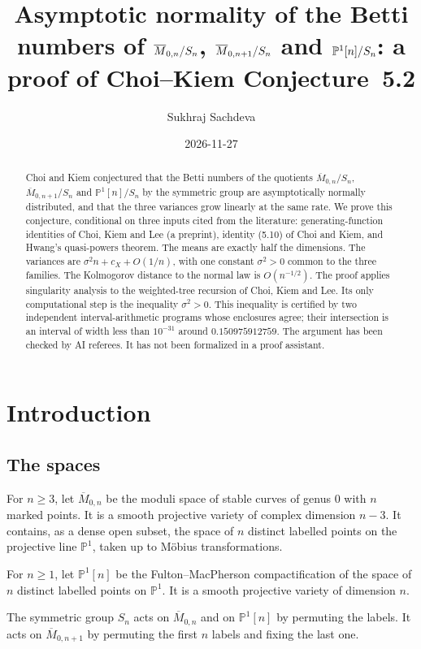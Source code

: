 \documentclass[11pt]{amsart}
\title[Asymptotic normality of Betti numbers of moduli quotients]{Asymptotic normality of the Betti numbers of \(\Mbar_{0,n}/S_n\), \(\Mbar_{0,n+1}/S_n\) and \(\PP^1[n]/S_n\): a proof of Choi--Kiem Conjecture~5.2}
\author{Sukhraj Sachdeva}
\date{2026-11-27\doiline}
\theoremstyle{definition}
\theoremstyle{remark}
\numberwithin{equation}{section}
\newcommand{\Mbar}{\overline{M}}
\newcommand{\PP}{\mathbb{P}}
\begin{document}
\begin{abstract}
Choi and Kiem conjectured that the Betti numbers of the quotients \(\Mbar_{0,n}/S_n\), \(\Mbar_{0,n+1}/S_n\) and \(\PP^1[n]/S_n\) by the symmetric group are asymptotically normally distributed, and that the three variances grow linearly at the same rate. We prove this conjecture, conditional on three inputs cited from the literature: generating-function identities of Choi, Kiem and Lee (a preprint), identity (5.10) of Choi and Kiem, and Hwang's quasi-powers theorem. The means are exactly half the dimensions. The variances are \(\sigma^2 n+c_X+O(1/n)\), with one constant \(\sigma^2>0\) common to the three families. The Kolmogorov distance to the normal law is \(O(n^{-1/2})\). The proof applies singularity analysis to the weighted-tree recursion of Choi, Kiem and Lee. Its only computational step is the inequality \(\sigma^2>0\). This inequality is certified by two independent interval-arithmetic programs whose enclosures agree; their intersection is an interval of width less than \(10^{-31}\) around \(0.150975912759\). The argument has been checked by AI referees. It has not been formalized in a proof assistant.
\end{abstract}

\maketitle

\section{Introduction}\label{sec:intro}

\subsection{The spaces}

For \(n\ge 3\), let \(\Mbar_{0,n}\) be the moduli space of stable curves of genus \(0\) with \(n\) marked points. It is a smooth projective variety of complex dimension \(n-3\). It contains, as a dense open subset, the space of \(n\) distinct labelled points on the projective line \(\PP^1\), taken up to M\"obius transformations.

For \(n\ge 1\), let \(\PP^1[n]\) be the Fulton--MacPherson compactification of the space of \(n\) distinct labelled points on \(\PP^1\). It is a smooth projective variety of dimension \(n\).

The symmetric group \(S_n\) acts on \(\Mbar_{0,n}\) and on \(\PP^1[n]\) by permuting the labels. It acts on \(\Mbar_{0,n+1}\) by permuting the first \(n\) labels and fixing the last one.
\end{document}
